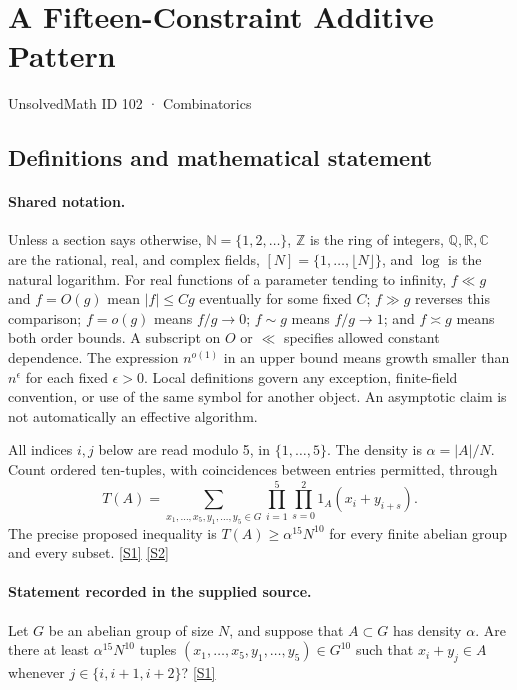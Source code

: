 \documentclass[11pt,a4paper]{article}
\newcommand{\N}{\mathbb{N}}
\newcommand{\Z}{\mathbb{Z}}
\newcommand{\Q}{\mathbb{Q}}
\newcommand{\R}{\mathbb{R}}
\newcommand{\C}{\mathbb{C}}
\newcommand{\sref}[2]{\hyperlink{source:#1:#2}{[S#2]}}
\begin{document}

\setcounter{section}{101}

\section{A Fifteen-Constraint Additive Pattern}\label{102}

{\small\sffamily UnsolvedMath ID 102 · Combinatorics}

\subsection{Definitions and mathematical statement}

\paragraph{Shared notation.}Unless a section says otherwise, $\N=\{1,2,\ldots\}$,
$\Z$ is the ring of integers, $\Q,\R,\C$ are the rational, real, and complex
fields, $[N]=\{1,\ldots,\lfloor N\rfloor\}$, and $\log$ is the natural
logarithm. For real functions of a parameter tending to infinity,
$f\ll g$ and $f=O(g)$ mean $|f|\leq Cg$ eventually for some fixed $C$;
$f\gg g$ reverses this comparison; $f=o(g)$ means $f/g\to0$;
$f\sim g$ means $f/g\to1$; and $f\asymp g$ means both order bounds.
A subscript on $O$ or $\ll$ specifies allowed constant dependence.
The expression $n^{o(1)}$ in an upper bound means growth smaller than
$n^\epsilon$ for each fixed $\epsilon>0$. Local definitions govern any
exception, finite-field convention, or use of the same symbol for another
object. An asymptotic claim is not automatically an effective algorithm.



All indices $i,j$ below are read modulo 5, in $\{1,\ldots,5\}$. The density is $\alpha=|A|/N$. Count ordered ten-tuples, with coincidences between entries permitted, through
\[T(A)=\sum_{x_1,\ldots,x_5,y_1,\ldots,y_5\in G}\prod_{i=1}^5\prod_{s=0}^2 1_A(x_i+y_{i+s}).\]
The precise proposed inequality is $T(A)\geq\alpha^{15}N^{10}$ for every finite abelian group and every subset. \sref{102}{1} \sref{102}{2}

\paragraph{Statement recorded in the supplied source.}
Let $G$ be an abelian group of size $N$, and suppose that $A \subset G$ has density $\alpha$. Are there at least $\alpha^{15}N^{10}$ tuples $(x_1, \ldots, x_5, y_1, \ldots, y_5) \in G^{10}$ such that $x_i + y_j \in A$ whenever $j \in \{i, i+1, i+2\}$? \sref{102}{1}
\end{document}
